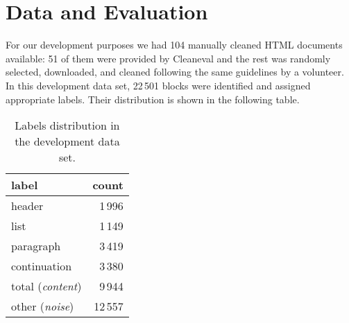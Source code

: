 \documentclass[12pt,a4paper, fleqn, leqno, twoside]{article}
\begin{document}
% 
% 
% 
 

\section{Data and Evaluation}

For our development purposes we had 104 manually cleaned HTML documents available: 51 of them were provided by Cleaneval and the rest was randomly selected, downloaded, and cleaned following the same guidelines by a volunteer. In this development data set, 22\,501 blocks were identified and assigned appropriate labels. Their distribution is shown in the following table.

\begin{table}[h]
  
\begin{center}
\begin{tabular}{|l|r|}
\hline
label & count \\
\hline
header & 1\,996 \\
list  & 1\,149 \\
paragraph  &  3\,419 \\
continuation &   3\,380 \\
\hline
total (\textit{content}) & 9\,944 \\
\hline
other (\textit{noise})  & 12\,557 \\
\hline
\end{tabular}
\end{center}
\caption{Labels distribution in the development data set.}
\label{tab2}
\end{table}
\end{document}
